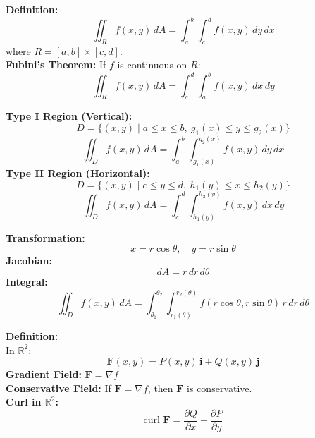 \documentclass[2pt]{article}
\begin{document}
\begin{multicols}{2}
\begin{tcolorbox}[title=\textbf{Double Integrals over Rectangles}, colframe=lightyellow]
    \textbf{Definition:}
    \[ \iint_R f(x, y) \, dA = \int_a^b \int_c^d f(x, y) \, dy \, dx \]
    where \( R = [a, b] \times [c, d] \). \\
    \textbf{Fubini's Theorem:} If \( f \) is continuous on \( R \):
    \[ \iint_R f(x, y) \, dA = \int_c^d \int_a^b f(x, y) \, dx \, dy \]
\end{tcolorbox}

\begin{tcolorbox}[title=\textbf{Double Integrals over General Regions}, colframe=lightblue]
    \textbf{Type I Region (Vertical):}
    \[ D = \{ (x, y) \mid a \leq x \leq b, \ g_1(x) \leq y \leq g_2(x) \} \]
    \[ \iint_D f(x, y) \, dA = \int_a^b \int_{g_1(x)}^{g_2(x)} f(x, y) \, dy \, dx \]
    \textbf{Type II Region (Horizontal):}
    \[ D = \{ (x, y) \mid c \leq y \leq d, \ h_1(y) \leq x \leq h_2(y) \} \]
    \[ \iint_D f(x, y) \, dA = \int_c^d \int_{h_1(y)}^{h_2(y)} f(x, y) \, dx \, dy \]
\end{tcolorbox}

\begin{tcolorbox}[title=\textbf{Double Integrals in Polar Coordinates}, colframe=lightgreen]
    \textbf{Transformation:}
    \[ x = r \cos \theta, \quad y = r \sin \theta \]
    \textbf{Jacobian:}
    \[ dA = r \, dr \, d\theta \]
    \textbf{Integral:}
    \[ \iint_D f(x, y) \, dA = \int_{\theta_1}^{\theta_2} \int_{r_1(\theta)}^{r_2(\theta)} f(r \cos \theta, r \sin \theta) \, r \, dr \, d\theta \]
\end{tcolorbox}

\begin{tcolorbox}[title=\textbf{Vector Fields}, colframe=lightpink]
    \textbf{Definition:} \\
    In \( \mathbb{R}^2 \):
    \[ \mathbf{F}(x, y) = P(x, y) \, \mathbf{i} + Q(x, y) \, \mathbf{j} \]
    \textbf{Gradient Field:} \( \mathbf{F} = \nabla f \) \\
    \textbf{Conservative Field:} If \( \mathbf{F} = \nabla f \), then \( \mathbf{F} \) is conservative. \\
    \textbf{Curl in \( \mathbb{R}^2 \):}
    \[ \text{curl } \mathbf{F} = \frac{\partial Q}{\partial x} - \frac{\partial P}{\partial y} \]
\end{tcolorbox}


\end{multicols}
\end{document}
